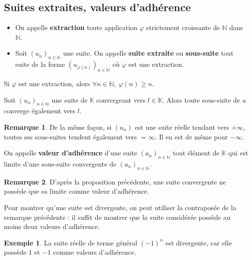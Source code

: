 \documentclass[french]{article}
\newcommand{\N}{\mathbb{N}}
\newcommand{\K}{\mathbb{K}}
\theoremstyle{plain}
\theoremstyle{definition}
\newtheorem*{ex}{Exemple}
\newtheorem*{rmq}{Remarque}
\theoremstyle{remark}
\begin{document}
\subsection{Suites extraites, valeurs d'adhérence}

\begin{dfn}
	\begin{itemize}
		\item On appelle \textbf{extraction} toute application $\varphi$ strictement croissante de $\N$ dans $\N$.
		\item Soit $(u_n)_{n\in\N}$ une suite. On appelle \textbf{suite extraite} ou \textbf{sous-suite} tout suite de la forme $(u_{\varphi(n)})_{n\in\N}$ où $\varphi$ est une extraction.
	\end{itemize}
\end{dfn}

\begin{lem}%
	Si $\varphi$ est une extraction, alors $\forall n\in\N,\ \varphi(n)\geqslant n$.
\end{lem}

\begin{prop}%
	Soit $(u_n)_{n\in\N}$ une suite de $\K$ convergeant vers $l\in\K$. Alors toute sous-suite de $u$ converge également vers $l$.
\end{prop}

\begin{rmq}
	De la même façon, si $(u_n)$ est une suite réelle tendant vers $+\infty$, toutes ses sous-suites tendent également vers $=\infty$. Il en est de même pour $-\infty$.
\end{rmq}

\begin{dfn}
	On appelle \textbf{valeur d'adhérence} d'une suite $(a_n)_{n\in\N}$ tout élément de $\K$ qui est limite d'une sous-suite convergente de $(a_n)_{n\in\N}$.
\end{dfn}

\begin{rmq}
	D'après la proposition précédente, une suite convergente ne possède que sa limite comme valeur d'adhérence.
\end{rmq}

\begin{met}
	Pour montrer qu'une suite est divergente, on peut utiliser la contraposée de la remarque précédente : il suffit de montrer que la suite considérée possède au moins deux valeurs d'adhérence.
\end{met}

\begin{ex}
	La suite réelle de terme général $(-1)^n$ est divergente, car elle possède $1$ et $-1$ comme valeurs d'adhérence.
\end{ex}
\end{document}
